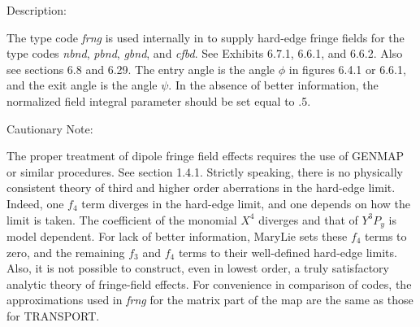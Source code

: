 \vspace{5mm}
     Description:
\vspace{2mm}

    The type code {\em frng} is used internally in \Mary to supply
hard-edge fringe fields for the type codes {\em nbnd}, {\em pbnd}, {\em
gbnd}, and {\em cfbd}.  See Exhibits 6.7.1, 6.6.1, and 6.6.2.  Also see
sections 6.8 and 6.29.  The entry angle is the angle $\phi$ in figures
6.4.1 or 6.6.1, and the exit angle is the angle $\psi$.  In the absence of better information, the normalized field integral parameter should be set equal to .5.

\vspace{5mm}
      Cautionary Note:
\vspace{2mm}

     The proper treatment of dipole fringe field effects requires the use
	 of GENMAP or similar procedures.  See section 1.4.1. Strictly speaking, there is no physically consistent theory of third and higher order aberrations in the hard-edge limit.  Indeed, one $ f_4$ term diverges in the hard-edge limit, and one depends on how the limit is taken.  The coefficient of the monomial $X^4$ diverges and that of $Y^3P_y$ is model dependent. For lack of better information, MaryLie sets these $f_4$ terms to zero, and the remaining $f_3$ and $f_4$ terms to their well-defined hard-edge limits.  Also, it is not possible to construct, even in lowest order, a truly satisfactory analytic theory of fringe-field effects.  For convenience in comparison of codes, the approximations used in {\em frng} for the matrix part of the map are the same as those for TRANSPORT.

